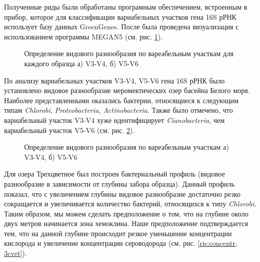 Полученные риды были обработаны програмным обеспечением, встроенным в прибор, которое для классификации вариабельных участков гена 16S рРНК использует базу данных GreenGenes. После была проведена визуализация с использованием программы MEGAN5 (см. рис. \ref{ris:taxonomy_V3-V4, V5-V6}). 

\begin{figure}[h]
\begin{minipage}[h]{0.5\linewidth}
\end{minipage}
\hfill
\begin{minipage}[h]{0.5\linewidth}
\end{minipage}
\caption{Определение видового разнообразия по вареабельным участкам для каждого образца а) V3-V4, б) V5-V6}
\label{ris:taxonomy_V3-V4, V5-V6}
\end{figure}

По анализу вариабельных участков V3-V4, V5-V6 гена 16S рРНК было установлено видовое разнообразие меромектических озер басейна Белого моря. Наиболее представленными оказались бактерии, относящиеся к следующим типам \textit{Chlorobi}, \textit{Proteobacteria}, \textit{Actinobacteria}.  Также было отмечено, что вариабельный участок V3-V4 хуже идентифицирует \textit{Cianobacteria}, чем вариабельный участок V5-V6   (см. рис. \ref{ris:V3-V4, V5-V6}). 

\begin{figure}[h]
\begin{minipage}[h]{0.5\linewidth}
\end{minipage}
\hfill
\begin{minipage}[h]{0.5\linewidth}
\end{minipage}
\caption{Определение видового разнообразия по вареабельным участкам а) V3-V4, б) V5-V6}
\label{ris:V3-V4, V5-V6}
\end{figure}

Для озера Трехцветное был построен бактериальный профиль (видовое разнообразие в зависимости от глубины забора образца). Данный профиль показал, что с увеличением глубины видовое разнообразие достаточно резко сокращается и увеличивается количество бактерий, относящихся к типу   \textit{Chlorobi}. Таким образом, мы можем сделать предположение о том, что на глубине около двух метров начинается зона хемоклина. Наше предположение подтверждается тем, что на данной глубине происходит резкое уменьшение концентрации кислорода и увеличение концентрации сероводорода (см. рис. \ref{ris:concentr, 3cvet}).  

